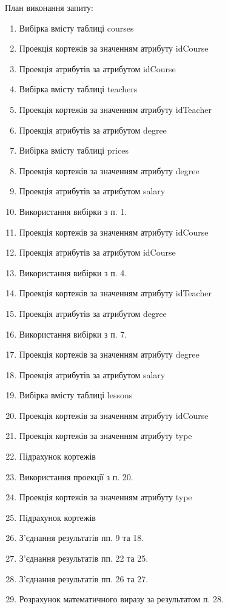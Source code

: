 План виконання запиту:
\begin{enumerate}
\setlength{\itemsep}{0pt}
\item Вибірка вмісту таблиці courses
\item Проекція кортежів за значенням атрибуту idCourse
\item Проекція атрибутів за атрибутом idCourse
\item Вибірка вмісту таблиці teachers
\item Проекція кортежів за значенням атрибуту idTeacher
\item Проекція атрибутів за атрибутом degree
\item Вибірка вмісту таблиці prices
\item Проекція кортежів за значенням атрибуту degree
\item Проекція атрибутів за атрибутом salary
\item Використання вибірки з п. 1.
\item Проекція кортежів за значенням атрибуту idCourse
\item Проекція атрибутів за атрибутом idCourse
\item Використання вибірки з п. 4.
\item Проекція кортежів за значенням атрибуту idTeacher
\item Проекція атрибутів за атрибутом degree
\item Використання вибірки з п. 7.
\item Проекція кортежів за значенням атрибуту degree
\item Проекція атрибутів за атрибутом salary
\item Вибірка вмісту таблиці lessons
\item Проекція кортежів за значенням атрибуту idCourse
\item Проекція кортежів за значенням атрибуту type
\item Підрахунок кортежів
\item Використання проекції з п. 20.
\item Проекція кортежів за значенням атрибуту type
\item Підрахунок кортежів
\item З'єднання результатів пп. 9 та 18.
\item З'єднання результатів пп. 22 та 25.
\item З'єднання результатів пп. 26 та 27.
\item Розрахунок математичного виразу за результатом п. 28.
\end{enumerate}

